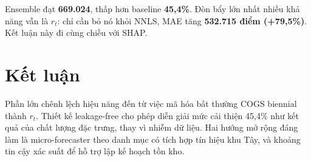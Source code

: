 \documentclass{article}
\begin{document}
Ensemble đạt \textbf{669.024}, thấp hơn baseline \textbf{45,4\%}. Đòn bẩy lớn
nhất nhiều khả năng vẫn là $r_t$: chỉ cần bỏ nó khỏi NNLS, MAE tăng
\textbf{532.715 điểm (+79,5\%)}. Kết luận này đi cùng chiều với SHAP.

\section*{Kết luận}

Phần lớn chênh lệch hiệu năng đến từ việc mã hóa bất thường COGS biennial thành
$r_t$. Thiết kế leakage-free cho phép diễn giải mức cải thiện 45,4\% như kết quả
của chất lượng đặc trưng, thay vì nhiễm dữ liệu. Hai hướng mở rộng đáng làm là
micro-forecaster theo danh mục có tích hợp tín hiệu khu Tây, và khoảng tin cậy
xác suất để hỗ trợ lập kế hoạch tồn kho.

\newpage
\end{document}

